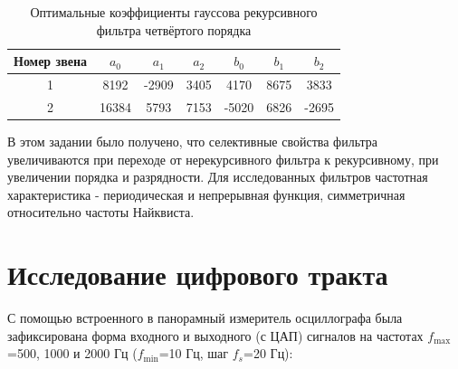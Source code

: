\documentclass[a4paper,14pt]{extarticle}
\begin{document}
\begin{table}[H]
\centering
\caption{Оптимальные  коэффициенты  гауссова  рекурсивного  фильтра  четвёртого порядка}
\vspace{0.5em}
\begin{tabular}{|c|c|c|c|c|c|c|}
\hline
Номер звена & $a_0$ & $a_1$ & $a_2$ & $b_0$ & $b_1$ & $b_2$ \\ \hline
1           & 8192    & -2909   & 3405    & 4170    & 8675    & 3833    \\ \hline
2           & 16384   & 5793    & 7153    & -5020   & 6826    & -2695   \\ \hline
\end{tabular}
\end{table}

В этом задании было получено, что селективные свойства фильтра увеличиваются при переходе от нерекурсивного фильтра к рекурсивному, при увеличении порядка и разрядности. Для исследованных фильтров частотная характеристика - периодическая и непрерывная функция, симметричная относительно частоты Найквиста. 




\newpage
\section{Исследование цифрового тракта}

С помощью встроенного в панорамный измеритель осциллографа была зафиксирована форма
входного и выходного (с ЦАП) сигналов на частотах $f_{\max}$=500, 1000 и 2000 Гц ($f_{\min}$=10 Гц, шаг $f_s$=20 Гц):
\end{document}
